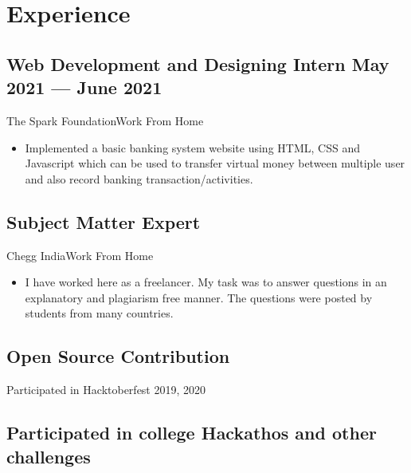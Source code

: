 \documentclass[a4,10pt]{article}
\newcommand{\subtext}[1]{
#1\par\vspace{-0.2cm}}
\newenvironment{zitemize}{
\begin{itemize}\itemsep2pt \parskip0pt \parsep1pt}
{\end{itemize}\vspace{-0.5cm}}
\begin{document}
\section{Experience}

\subsection*{Web Development and Designing Intern \hfill May 2021 --- June 2021} 
\subtext{The Spark Foundation\hfill Work From Home} 
    \begin{zitemize}
        \item Implemented a basic banking system website using HTML, CSS and Javascript which can be used to transfer virtual money between multiple user and also record banking transaction/activities.
    \end{zitemize}
    \subsection*{Subject Matter Expert  \hfill } 
\subtext{Chegg India\hfill Work From Home} 
    \begin{zitemize}
        \item I have worked here as a freelancer. My task was to answer questions in an explanatory and plagiarism free manner. The questions were posted by students from many countries. 
    \end{zitemize}
\subsection*{Open Source Contribution} 
\subtext{Participated in Hacktoberfest 2019, 2020\hfill } 
\subsection*{Participated in college Hackathos and other challenges} 
   
\end{document}

